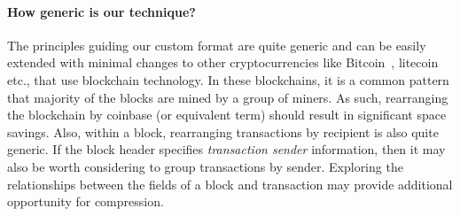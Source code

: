 \paragraph{How generic is our technique?}

The principles guiding our custom format are quite generic and can be easily
extended with minimal changes to other cryptocurrencies like Bitcoin~\citep{bitcoin}, litecoin~\citep{litecoin} etc., that use blockchain technology. 
In these blockchains, it is a common pattern that majority of the blocks are mined by a group of miners. As such, rearranging the blockchain by coinbase (or equivalent term) should result in significant space savings.
Also, within a block, rearranging transactions by recipient is also 
quite generic.
If the block header specifies \emph{transaction sender} information, then
it may also be worth considering to group transactions by sender.
Exploring the relationships between the fields of a block and transaction
may provide additional opportunity for compression. 
